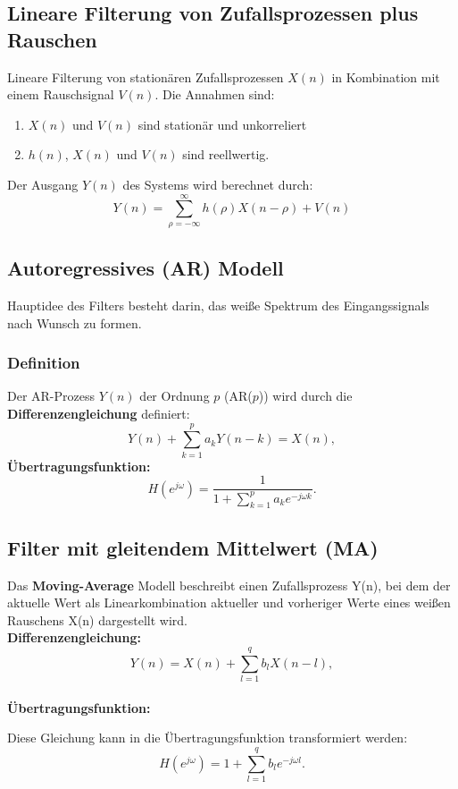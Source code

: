 \documentclass[12pt]{article}
\begin{document}
   \subsection{Lineare Filterung von Zufallsprozessen plus Rauschen}
      Lineare Filterung von stationären Zufallsprozessen \(X(n)\) in Kombination mit einem Rauschsignal \(V(n)\). Die Annahmen sind:
      \begin{enumerate}
         \item \(X(n)\) und \(V(n)\) sind stationär und unkorreliert
         \item \(h(n)\), \(X(n)\) und \(V(n)\) sind reellwertig.
      \end{enumerate}

      Der Ausgang \(Y(n)\) des Systems wird berechnet durch:
      \[
         Y(n) = \sum_{\rho=-\infty}^\infty h(\rho)X(n-\rho) + V(n)
      \]

   \subsection{Autoregressives (AR) Modell}
      Hauptidee des Filters besteht darin, das weiße Spektrum des Eingangssignals nach Wunsch zu formen.
      \subsubsection{Definition}
         Der AR-Prozess \(Y(n)\) der Ordnung \(p\) (AR(\(p\))) wird durch die \textbf{Differenzengleichung} definiert:  %
         \[
            Y(n) + \sum_{k=1}^p a_k Y(n-k) = X(n),
         \]
         \textbf{Übertragungsfunktion:}
         \[
            H(e^{j\omega}) = \frac{1}{1 + \sum_{k=1}^p a_k e^{-j\omega k}}.
         \]

   \subsection{Filter mit gleitendem Mittelwert (MA)}
      Das \textbf{Moving-Average} Modell beschreibt einen Zufallsprozess Y(n), bei dem der aktuelle Wert als Linearkombination aktueller und vorheriger Werte eines weißen Rauschens X(n) dargestellt wird. %
      \\
      \textbf{Differenzengleichung:}
      \[
         Y(n) = X(n) + \sum_{l=1}^{q} b_l X(n-l),
      \]
      \\
      \textbf{Übertragungsfunktion:}

      Diese Gleichung kann in die Übertragungsfunktion transformiert werden:
      \[
         H(e^{j\omega}) = 1 + \sum_{l=1}^q b_l e^{-j\omega l}.
      \]
\end{document}
